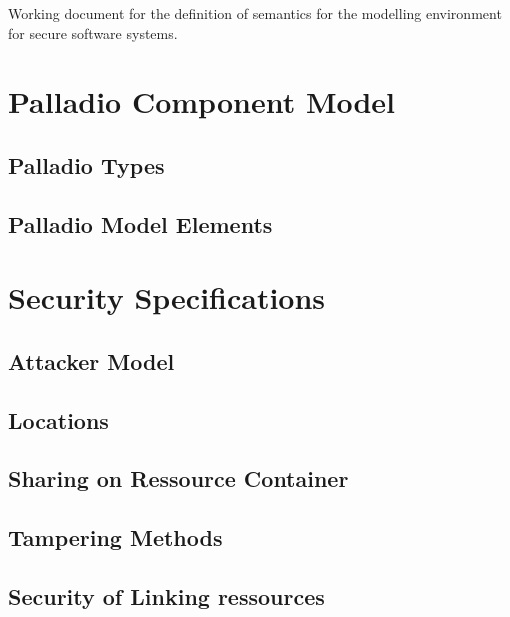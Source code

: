 \documentclass[varwidth=25cm]{article}
\begin{document}
Working document for the definition of semantics for the modelling environment for secure software systems.

\section{Palladio Component Model}

\subsection{Palladio Types}



\subsection{Palladio Model Elements}



\newpage


\section{Security Specifications}

\subsection{Attacker Model}



\subsection{Locations}



\subsection{Sharing on Ressource Container}



\subsection{Tampering Methods}



\subsection{Security of Linking ressources}
\end{document}
